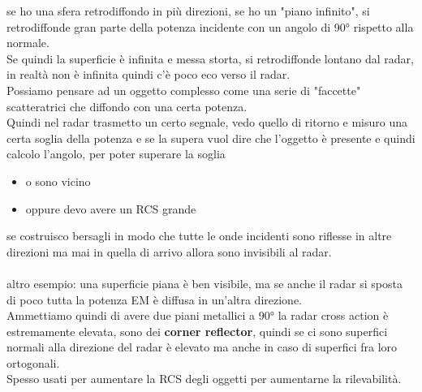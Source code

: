 \documentclass[oneside, 12pt]{extbook}
\begin{document}
se ho una sfera retrodiffondo in più direzioni, se ho un "piano infinito", si retrodiffonde gran parte della potenza incidente con un angolo di 90° rispetto alla normale.\\Se quindi la superficie è infinita e messa storta, si retrodiffonde lontano dal radar, in realtà non è infinita quindi c'è poco eco verso il radar.\\Possiamo pensare ad un oggetto complesso come una serie di "faccette" scatteratrici che diffondo con una certa potenza.\\
Quindi nel radar trasmetto un certo segnale, vedo quello di ritorno e misuro una certa soglia della potenza e se la supera vuol dire che l'oggetto è presente e quindi calcolo l'angolo, per poter superare la soglia
\begin{itemize}
	\item o sono vicino
	\item oppure devo avere un RCS grande
\end{itemize}
se costruisco bersagli in modo che tutte le onde incidenti sono riflesse in altre direzioni ma mai in quella di arrivo allora sono invisibili al radar.\\\\
altro esempio: una superficie piana è ben visibile, ma se anche il radar si sposta di poco tutta la potenza EM è diffusa in un'altra direzione.\\
Ammettiamo quindi di avere due piani metallici a 90° la radar cross action è estremamente elevata, sono dei \textbf{corner reflector}, quindi se ci sono superfici normali alla direzione del radar è elevato ma anche in caso di superfici fra loro ortogonali.\\
Spesso usati per aumentare la RCS degli oggetti per aumentarne la rilevabilità.
\end{document}
